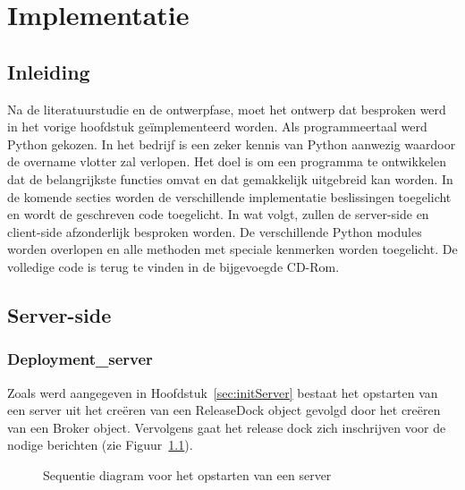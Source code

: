 \chapter{Implementatie}
\section{Inleiding}
Na de literatuurstudie en de ontwerpfase, moet het ontwerp dat besproken werd in het vorige hoofdstuk geïmplementeerd worden.
Als programmeertaal werd Python gekozen.
In het bedrijf is een zeker kennis van Python aanwezig waardoor de overname vlotter zal verlopen.
Het doel is om een programma te ontwikkelen dat de belangrijkste functies omvat en dat gemakkelijk uitgebreid kan worden.
In de komende secties worden de verschillende implementatie beslissingen toegelicht en wordt de geschreven code toegelicht.
In wat volgt, zullen de server-side en client-side afzonderlijk besproken worden.
De verschillende Python modules worden overlopen en alle methoden met speciale kenmerken worden toegelicht.
De volledige code is terug te vinden in de bijgevoegde CD-Rom.

\section{Server-side}
\subsection{Deployment\_server}
Zoals werd aangegeven in Hoofdstuk~\ref{sec:initServer} bestaat het opstarten van een server uit het creëren van een ReleaseDock object gevolgd door het creëren van een Broker object.
Vervolgens gaat het release dock zich inschrijven voor de nodige berichten (zie Figuur~\ref{fig:seqStartServerNew}).

\begin{figure}[!ht]
\centering
{}
\caption{Sequentie diagram voor het opstarten van een server}
\label{fig:seqStartServerNew}
\end{figure}

